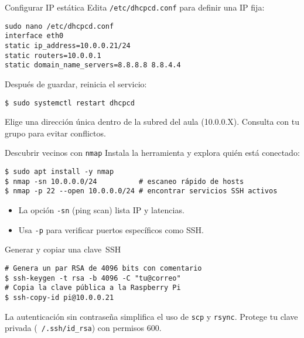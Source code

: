 \documentclass[aspectratio=169,professionalfonts]{beamer}
\begin{document}
\begin{frame}[fragile]{Configurar IP estática}
  Edita \texttt{/etc/dhcpcd.conf} para definir una IP fija:
  \begin{verbatim}
sudo nano /etc/dhcpcd.conf
interface eth0
static ip_address=10.0.0.21/24
static routers=10.0.0.1
static domain_name_servers=8.8.8.8 8.8.4.4
  \end{verbatim}
  Después de guardar, reinicia el servicio:
  \begin{verbatim}
$ sudo systemctl restart dhcpcd
  \end{verbatim}
  \begin{infobox}
  Elige una dirección única dentro de la subred del aula (10.0.0.X). Consulta con tu grupo para evitar conflictos.
  \end{infobox}
\end{frame}

\begin{frame}[fragile]{Descubrir vecinos con \texttt{nmap}}
  Instala la herramienta y explora quién está conectado:
  \begin{verbatim}
$ sudo apt install -y nmap
$ nmap -sn 10.0.0.0/24          # escaneo rápido de hosts
$ nmap -p 22 --open 10.0.0.0/24 # encontrar servicios SSH activos
  \end{verbatim}
  \begin{itemize}
    \item La opción \texttt{-sn} (ping scan) lista IP y latencias.
    \item Usa \texttt{-p} para verificar puertos específicos como SSH.
  \end{itemize}
\end{frame}

\begin{frame}[fragile]{Generar y copiar una clave SSH}
  \begin{verbatim}
# Genera un par RSA de 4096 bits con comentario
$ ssh-keygen -t rsa -b 4096 -C "tu@correo"
# Copia la clave pública a la Raspberry Pi
$ ssh-copy-id pi@10.0.0.21
  \end{verbatim}
  \begin{infobox}
  La autenticación sin contraseña simplifica el uso de \texttt{scp} y \texttt{rsync}. Protege tu clave privada (\texttt{~/.ssh/id\_rsa}) con permisos 600.
  \end{infobox}
\end{frame}
\end{document}
